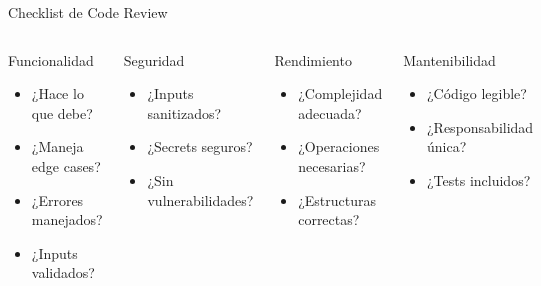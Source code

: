\documentclass[aspectratio=169]{beamer}
\begin{document}
\begin{frame}{Checklist de Code Review}
    \begin{columns}[t]
        \begin{block}{Funcionalidad}
            \begin{itemize}
                \item[\faCheckSquare] ¿Hace lo que debe?
                \item[\faCheckSquare] ¿Maneja edge cases?
                \item[\faCheckSquare] ¿Errores manejados?
                \item[\faCheckSquare] ¿Inputs validados?
            \end{itemize}
        \end{block}
        
        \begin{block}{Seguridad}
            \begin{itemize}
                \item[\faCheckSquare] ¿Inputs sanitizados?
                \item[\faCheckSquare] ¿Secrets seguros?
                \item[\faCheckSquare] ¿Sin vulnerabilidades?
            \end{itemize}
        \end{block}
        
        \begin{block}{Rendimiento}
            \begin{itemize}
                \item[\faCheckSquare] ¿Complejidad adecuada?
                \item[\faCheckSquare] ¿Operaciones necesarias?
                \item[\faCheckSquare] ¿Estructuras correctas?
            \end{itemize}
        \end{block}
        
        \begin{block}{Mantenibilidad}
            \begin{itemize}
                \item[\faCheckSquare] ¿Código legible?
                \item[\faCheckSquare] ¿Responsabilidad única?
                \item[\faCheckSquare] ¿Tests incluidos?
            \end{itemize}
        \end{block}
    \end{columns}
\end{frame}
\end{document}
